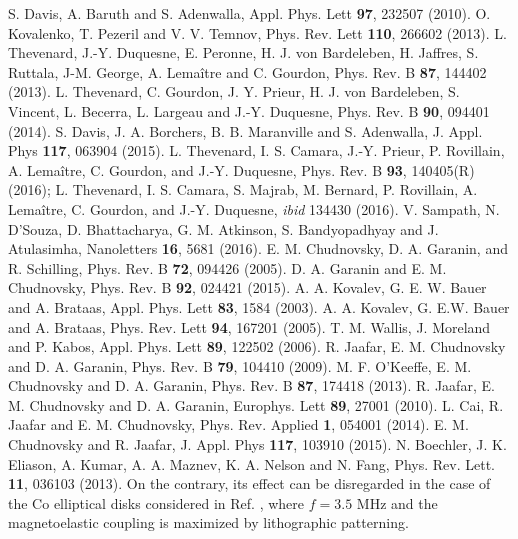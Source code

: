 \documentclass[aps,prb,floats,twocolumn]{revtex4}
\begin{document}
\begin{thebibliography}{10}
S. Davis, A. Baruth and S. Adenwalla, Appl. Phys. Lett {\bf 97}, 232507 (2010). 
O. Kovalenko, T. Pezeril and V. V. Temnov, Phys. Rev. Lett {\bf 110}, 266602 (2013).
L. Thevenard, J.-Y. Duquesne, E. Peronne, H. J. von Bardeleben, H. Jaffres, S. Ruttala, J-M. George, A. Lema\^{i}tre and C. Gourdon, Phys. Rev. B {\bf 87}, 144402 (2013).
L. Thevenard, C. Gourdon, J. Y. Prieur, H. J. von Bardeleben, S. Vincent, L. Becerra, L. Largeau and J.-Y. Duquesne, Phys. Rev. B {\bf 90}, 094401 (2014).
S. Davis, J. A. Borchers, B. B. Maranville and S. Adenwalla, J. Appl. Phys {\bf 117}, 063904 (2015).
L. Thevenard, I. S. Camara, J.-Y. Prieur, P. Rovillain, A. Lema\^{i}tre, C. Gourdon, and J.-Y. Duquesne, Phys. Rev. B {\bf 93}, 140405(R) (2016); L. Thevenard, I. S. Camara, S. Majrab, M. Bernard, P. Rovillain, A. Lema\^{i}tre, C. Gourdon, and J.-Y. Duquesne, {\it ibid} 134430 (2016).
V. Sampath, N. D'Souza, D. Bhattacharya, G. M. Atkinson, S. Bandyopadhyay and J. Atulasimha, Nanoletters {\bf 16}, 5681 (2016).
E. M. Chudnovsky, D. A. Garanin, and R. Schilling, Phys. Rev. B {\bf 72}, 094426 (2005).
D. A. Garanin and E. M. Chudnovsky, Phys. Rev. B {\bf 92}, 024421 (2015).
A. A. Kovalev, G. E. W. Bauer and A. Brataas, Appl. Phys. Lett {\bf 83}, 1584 (2003).
A. A. Kovalev, G. E.W. Bauer and A. Brataas, Phys. Rev. Lett {\bf 94}, 167201 (2005).
T. M. Wallis, J. Moreland and P. Kabos, Appl. Phys. Lett {\bf 89}, 122502 (2006).
R. Jaafar, E. M. Chudnovsky and D. A. Garanin, Phys. Rev. B {\bf 79}, 104410 (2009).
M. F. O'Keeffe, E. M. Chudnovsky and D. A. Garanin, Phys. Rev. B {\bf 87}, 174418 (2013). 
R. Jaafar, E. M. Chudnovsky and D. A. Garanin, Europhys. Lett {\bf 89}, 27001 (2010).
L. Cai, R. Jaafar and E. M. Chudnovsky, Phys. Rev. Applied {\bf 1}, 054001 (2014).
E. M. Chudnovsky and R. Jaafar, J. Appl. Phys {\bf 117}, 103910 (2015). 
N. Boechler, J. K. Eliason, A. Kumar, A. A. Maznev, K. A. Nelson and N. Fang, Phys. Rev. Lett. {\bf 11}, 036103 (2013).
On the contrary, its effect can be disregarded in the case of the Co elliptical disks considered in Ref. , where $f=3.5$ MHz and the magnetoelastic coupling is maximized by lithographic patterning.

\end{thebibliography}
\end{document}
